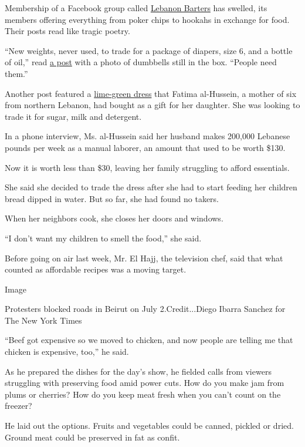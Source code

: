 Membership of a Facebook group called
\href{https://www.facebookcorewwwi.onion/groups/697518051074366/permalink/722296395263198/}{Lebanon
Barters} has swelled, its members offering everything from poker chips
to hookahs in exchange for food. Their posts read like tragic poetry.

``New weights, never used, to trade for a package of diapers, size 6,
and a bottle of oil,'' read
\href{https://www.facebookcorewwwi.onion/groups/697518051074366/permalink/722718038554367/}{a
post} with a photo of dumbbells still in the box. ``People need them.''

Another post featured a
\href{https://www.facebookcorewwwi.onion/groups/697518051074366/permalink/722296395263198/}{lime-green
dress} that Fatima al-Hussein, a mother of six from northern Lebanon,
had bought as a gift for her daughter. She was looking to trade it for
sugar, milk and detergent.

In a phone interview, Ms. al-Hussein said her husband makes 200,000
Lebanese pounds per week as a manual laborer, an amount that used to be
worth \$130.

Now it is worth less than \$30, leaving her family struggling to afford
essentials.

She said she decided to trade the dress after she had to start feeding
her children bread dipped in water. But so far, she had found no takers.

When her neighbors cook, she closes her doors and windows.

``I don't want my children to smell the food,'' she said.

Before going on air last week, Mr. El Hajj, the television chef, said
that what counted as affordable recipes was a moving target.

Image

Protesters blocked roads in Beirut on July 2.Credit...Diego Ibarra
Sanchez for The New York Times

``Beef got expensive so we moved to chicken, and now people are telling
me that chicken is expensive, too,'' he said.

As he prepared the dishes for the day's show, he fielded calls from
viewers struggling with preserving food amid power cuts. How do you make
jam from plums or cherries? How do you keep meat fresh when you can't
count on the freezer?

He laid out the options. Fruits and vegetables could be canned, pickled
or dried. Ground meat could be preserved in fat as confit.

